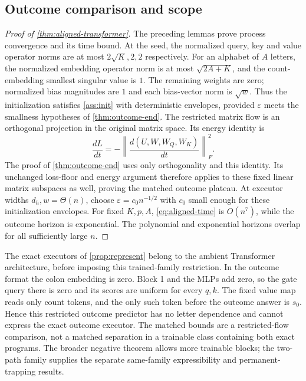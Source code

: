 \subsection{Outcome comparison and scope}
\begin{proof}[Proof of \cref{thm:aligned-transformer}]
The preceding lemmas prove process convergence and its time bound.
At the seed, the normalized query, key and value operator norms are at most
$2\sqrt K,2,2$ respectively. For an alphabet of $A$ letters, the normalized
embedding operator norm is at most $\sqrt{2A+K}$, and the count-embedding
smallest singular value is $1$. The remaining weights are zero; normalized
bias magnitudes are $1$ and each bias-vector norm is $\sqrt w$.
Thus the initialization satisfies \cref{ass:init} with deterministic envelopes,
provided $\varepsilon$ meets the smallness hypotheses of \cref{thm:outcome-end}.
The restricted matrix flow is an orthogonal projection in the original matrix space.
Its energy identity is
\[
 \frac{dL}{dt}=-\left\|\frac{d(U,W,W_Q,W_K)}{dt}\right\|_F^2.
\]
The proof of \cref{thm:outcome-end} uses only orthogonality and this identity.
Its unchanged loss-floor and energy argument therefore applies to these fixed
linear matrix subspaces as well, proving the matched outcome plateau.
At executor widths $d_h,w=\Theta(n)$, choose $\varepsilon=c_0n^{-1/2}$ with
$c_0$ small enough for these initialization envelopes. For fixed $K,p,A$,
\cref{eq:aligned-time} is $O(n^7)$, while the outcome horizon is exponential.
The polynomial and exponential horizons overlap for all sufficiently large $n$.
\end{proof}

The exact executors of \cref{prop:represent} belong to the ambient Transformer
architecture, before imposing this trained-family restriction.
In the outcome format the colon embedding is zero. Block 1 and the MLPs add zero,
so the gate query there is zero and its scores are uniform for every $q,k$.
The fixed value map reads only count tokens, and the only such token before the
outcome answer is $s_0$. Hence this restricted outcome predictor has no letter
dependence and cannot express the exact outcome executor.
The matched bounds are a restricted-flow comparison, not a matched separation
in a trainable class containing both exact programs. The broader negative theorem
allows more trainable blocks; the two-path family supplies the separate same-family
expressibility and permanent-trapping results.
